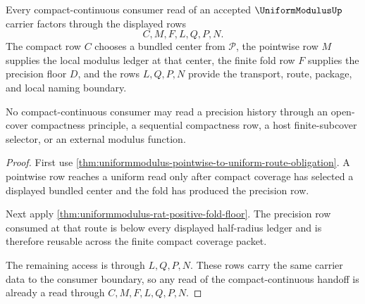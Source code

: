 \begin{theorem}
\label{thm:uniformmodulus-compact-continuous-consumer-boundary}
Every compact-continuous consumer read of an accepted $\UniformModulusUp$ carrier factors through the displayed rows
$$
C,M,F,L,Q,P,N.
$$
The compact row $C$ chooses a bundled center from $\mathcal{P}$, the pointwise row $M$ supplies the local modulus ledger at that center, the finite fold row $F$ supplies the precision floor $D$, and the rows $L,Q,P,N$ provide the transport, route, package, and local naming boundary.

No compact-continuous consumer may read a precision history through an open-cover compactness principle, a sequential compactness row, a host finite-subcover selector, or an external modulus function.
\end{theorem}
\begin{proof}
First use \autoref{thm:uniformmodulus-pointwise-to-uniform-route-obligation}. A pointwise row reaches a uniform read only after compact coverage has selected a displayed bundled center and the fold has produced the precision row.

Next apply \autoref{thm:uniformmodulus-rat-positive-fold-floor}. The precision row consumed at that route is below every displayed half-radius ledger and is therefore reusable across the finite compact coverage packet.

The remaining access is through $L,Q,P,N$. These rows carry the same carrier data to the consumer boundary, so any read of the compact-continuous handoff is already a read through $C,M,F,L,Q,P,N$.
\end{proof}

